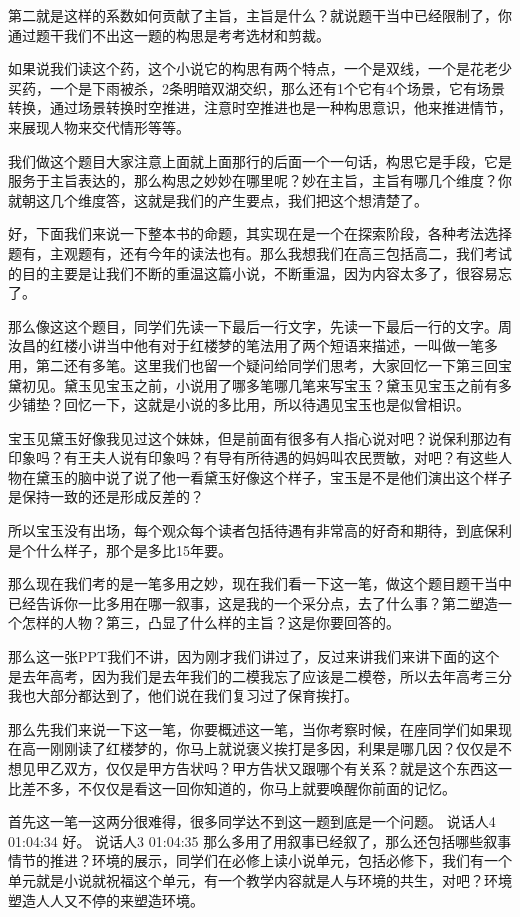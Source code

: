 \documentclass{ctexart}
\renewcommand{\\}{\par}
\begin{document}
第二就是这样的系数如何贡献了主旨，主旨是什么？就说题干当中已经限制了，你通过题干我们不出这一题的构思是考考选材和剪裁。

如果说我们读这个药，这个小说它的构思有两个特点，一个是双线，一个是花老少买药，一个是下雨被杀，2条明暗双湖交织，那么还有1个它有4个场景，它有场景转换，通过场景转换时空推进，注意时空推进也是一种构思意识，他来推进情节，来展现人物来交代情形等等。

我们做这个题目大家注意上面就上面那行的后面一个一句话，构思它是手段，它是服务于主旨表达的，那么构思之妙妙在哪里呢？妙在主旨，主旨有哪几个维度？你就朝这几个维度答，这就是我们的产生要点，我们把这个想清楚了。

好，下面我们来说一下整本书的命题，其实现在是一个在探索阶段，各种考法选择题有，主观题有，还有今年的读法也有。那么我想我们在高三包括高二，我们考试的目的主要是让我们不断的重温这篇小说，不断重温，因为内容太多了，很容易忘了。

那么像这这个题目，同学们先读一下最后一行文字，先读一下最后一行的文字。周汝昌的红楼小讲当中他有对于红楼梦的笔法用了两个短语来描述，一叫做一笔多用，第二还有多笔。这里我们也留一个疑问给同学们思考，大家回忆一下第三回宝黛初见。黛玉见宝玉之前，小说用了哪多笔哪几笔来写宝玉？黛玉见宝玉之前有多少铺垫？回忆一下，这就是小说的多比用，所以待遇见宝玉也是似曾相识。

宝玉见黛玉好像我见过这个妹妹，但是前面有很多有人指心说对吧？说保利那边有印象吗？有王夫人说有印象吗？有导有所待遇的妈妈叫农民贾敏，对吧？有这些人物在黛玉的脑中说了说了他一看黛玉好像这个样子，宝玉是不是他们演出这个样子是保持一致的还是形成反差的？

所以宝玉没有出场，每个观众每个读者包括待遇有非常高的好奇和期待，到底保利是个什么样子，那个是多比15年要。

那么现在我们考的是一笔多用之妙，现在我们看一下这一笔，做这个题目题干当中已经告诉你一比多用在哪一叙事，这是我的一个采分点，去了什么事？第二塑造一个怎样的人物？第三，凸显了什么样的主旨？这是你要回答的。

那么这一张PPT我们不讲，因为刚才我们讲过了，反过来讲我们来讲下面的这个是去年高考，因为我们是去年我们的二模我忘了应该是二模卷，所以去年高考三分我也大部分都达到了，他们说在我们复习过了保育挨打。

那么先我们来说一下这一笔，你要概述这一笔，当你考察时候，在座同学们如果现在高一刚刚读了红楼梦的，你马上就说褒义挨打是多因，利果是哪几因？仅仅是不想见甲乙双方，仅仅是甲方告状吗？甲方告状又跟哪个有关系？就是这个东西这一比差不多，不仅仅是看这一回你知道的，你马上就要唤醒你前面的记忆。

首先这一笔一这两分很难得，很多同学达不到这一题到底是一个问题。
说话人4 01:04:34
好。
说话人3 01:04:35
那么多用了用叙事已经叙了，那么还包括哪些叙事情节的推进？环境的展示，同学们在必修上读小说单元，包括必修下，我们有一个单元就是小说就祝福这个单元，有一个教学内容就是人与环境的共生，对吧？环境塑造人人又不停的来塑造环境。
\end{document}
